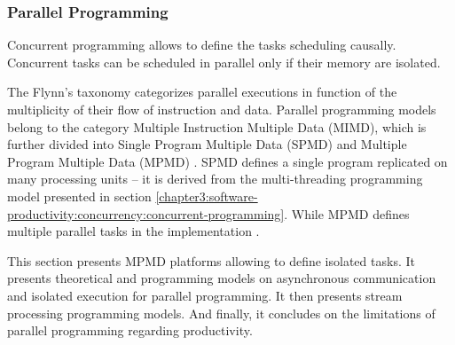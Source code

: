





\subsubsection{Parallel Programming} \label{chapter3:software-efficiency:concurrency:parallel-programming}


Concurrent programming allows to define the tasks scheduling causally.
Concurrent tasks can be scheduled in parallel only if their memory are isolated.

The Flynn's taxonomy \cite{Flynn1972} categorizes parallel executions in function of the multiplicity of their flow of instruction and data.
Parallel programming models belong to the category Multiple Instruction Multiple Data (MIMD), which is further divided into Single Program Multiple Data (SPMD) \cite{Auguin1983,Darema1988,Darema2001} and Multiple Program Multiple Data (MPMD) \cite{Chang1997,Chan2004}.
SPMD defines a single program replicated on many processing units \cite{Culler,Johnson1995,K.ManiChandy2005} -- it is derived from the multi-threading programming model presented in section \ref{chapter3:software-productivity:concurrency:concurrent-programming}.
While MPMD defines multiple parallel tasks in the implementation \cite{Grimshaw1991,Foster1995b,Foster1996}.



This section presents MPMD platforms allowing to define isolated tasks.
It presents theoretical and programming models on asynchronous communication and isolated execution for parallel programming.
It then presents stream processing programming models.
And finally, it concludes on the limitations of parallel programming regarding productivity. 



